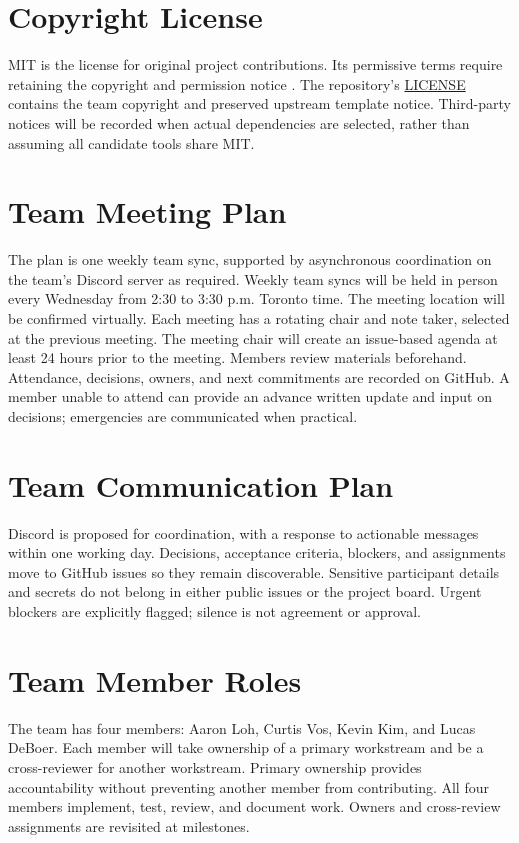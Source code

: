 \documentclass[11pt]{article}
\begin{document}
\section{Copyright License}
MIT is the license for original project contributions. Its permissive
terms require retaining the copyright and permission notice \citep{MITLicense}.
The repository's \href{https://github.com/NaturalControl/natural-control/blob/main/LICENSE}{LICENSE}
contains the team copyright and preserved upstream template notice. Third-party notices will be recorded when actual
dependencies are selected, rather than assuming all candidate tools share MIT.

\section{Team Meeting Plan}
The plan is one weekly team sync, supported by asynchronous coordination on the team's Discord server as required.
Weekly team syncs will be held in person every Wednesday from 2:30 to 3:30 p.m. Toronto time. The meeting location will
be confirmed virtually. Each meeting has a rotating chair and note taker, selected at the previous meeting.
The meeting chair will create an issue-based agenda at least 24 hours prior to the meeting.
Members review materials beforehand. Attendance, decisions, owners, and next commitments are recorded
on GitHub. A member unable to attend can provide an advance written update and input on decisions;
emergencies are communicated when practical.

\section{Team Communication Plan}
Discord is proposed for coordination, with a response to actionable messages
within one working day. Decisions, acceptance criteria, blockers, and assignments
move to GitHub issues so they remain discoverable. Sensitive participant details
and secrets do not belong in either public issues or the project board. Urgent
blockers are explicitly flagged; silence is not agreement or approval.

\section{Team Member Roles}
The team has four members: Aaron Loh, Curtis Vos, Kevin Kim, and Lucas DeBoer.
Each member will take ownership of a primary workstream and be a cross-reviewer for another workstream.
Primary ownership provides accountability without preventing another member from
contributing. All four members implement, test, review, and document work.
Owners and cross-review assignments are revisited at milestones.
\end{document}
